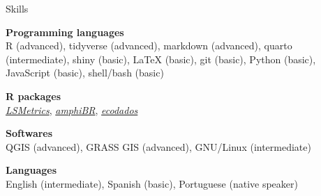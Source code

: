 \documentclass{resume}
\begin{document}
\begin{rSection}{Skills}

{\bf Programming languages}
\\ R (advanced), tidyverse (advanced), markdown (advanced), quarto (intermediate), shiny (basic), LaTeX (basic), git (basic), Python (basic), JavaScript (basic), shell/bash (basic)

{\bf R packages}
\\ \href{https://mauriciovancine.github.io/lsmetrics}{\it LSMetrics}, \href{https://paulobarros.github.io/amphiBR}{\it amphiBR}, \href{https://paternogbc.github.io/ecodados/}{\it ecodados}

{\bf Softwares}
\\ QGIS (advanced), GRASS GIS (advanced), GNU/Linux (intermediate)

{\bf Languages}
\\ English (intermediate), Spanish (basic), Portuguese (native speaker)

\end{rSection}
\end{document}

